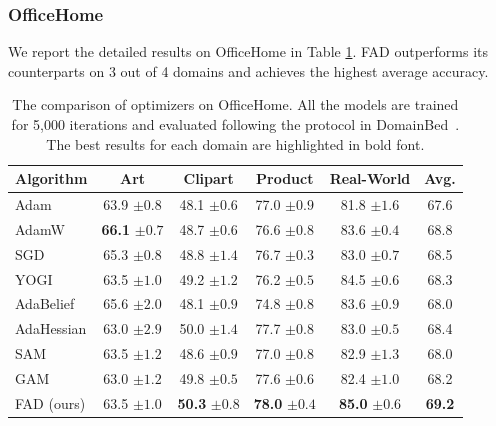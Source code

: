 \subsubsection{OfficeHome}
We report the detailed results on OfficeHome in Table \ref{tab:office5k}. FAD outperforms its counterparts on 3 out of 4 domains and achieves the highest average accuracy.
\begin{table}[th]
\centering
\caption{The comparison of optimizers on OfficeHome. All the models are trained for 5,000 iterations and evaluated following the protocol in DomainBed~\cite{gulrajani2020search}. The best results for each domain are highlighted in bold font.}
\begin{tabular}{lcccc|c}
\toprule
\textbf{Algorithm} & Art & Clipart & Product & Real-World  & \textbf{Avg.} \\
\midrule

Adam  & 63.9 \footnotesize{$\pm 0.8$} & 48.1 \footnotesize{$\pm 0.6$} & 77.0 \footnotesize{$\pm 0.9$} & 81.8 \footnotesize{$\pm 1.6$} & 67.6 \\
AdamW  & \textbf{66.1} \footnotesize{$\pm 0.7$} & 48.7 \footnotesize{$\pm 0.6$} & 76.6 \footnotesize{$\pm 0.8$} & 83.6 \footnotesize{$\pm 0.4$} & 68.8 \\
SGD  & 65.3 \footnotesize{$\pm 0.8$} & 48.8 \footnotesize{$\pm 1.4$} & 76.7 \footnotesize{$\pm 0.3$} & 83.0 \footnotesize{$\pm 0.7$} & 68.5 \\
YOGI  & 63.5 \footnotesize{$\pm 1.0$} & 49.2 \footnotesize{$\pm 1.2$} & 76.2 \footnotesize{$\pm 0.5$} & 84.5 \footnotesize{$\pm 0.6$} & 68.3 \\
AdaBelief  & 65.6 \footnotesize{$\pm 2.0$} & 48.1 \footnotesize{$\pm 0.9$} & 74.8 \footnotesize{$\pm 0.8$} & 83.6 \footnotesize{$\pm 0.9$} & 68.0\\
AdaHessian  & 63.0 \footnotesize{$\pm 2.9$} & 50.0 \footnotesize{$\pm 1.4$} & 77.7 \footnotesize{$\pm 0.8$} & 83.0 \footnotesize{$\pm 0.5$} & 68.4 \\
SAM  & 63.5 \footnotesize{$\pm 1.2$} & 48.6 \footnotesize{$\pm 0.9$}  & 77.0 \footnotesize{$\pm 0.8$} & 82.9 \footnotesize{$\pm 1.3$} & 68.0 \\
GAM  & 63.0 \footnotesize{$\pm 1.2$} & 49.8 \footnotesize{$\pm 0.5$}  & 77.6 \footnotesize{$\pm 0.6$}  & 82.4 \footnotesize{$\pm 1.0$} & 68.2 \\
\midrule
FAD (ours)  &  63.5 \footnotesize{$\pm 1.0$} & \textbf{50.3} \footnotesize{$\pm 0.8$}  & \textbf{78.0} \footnotesize{$\pm 0.4$} & \textbf{85.0} \footnotesize{$\pm 0.6$} &  \textbf{69.2}\\

\bottomrule
\end{tabular}
\label{tab:office5k}
\end{table}


